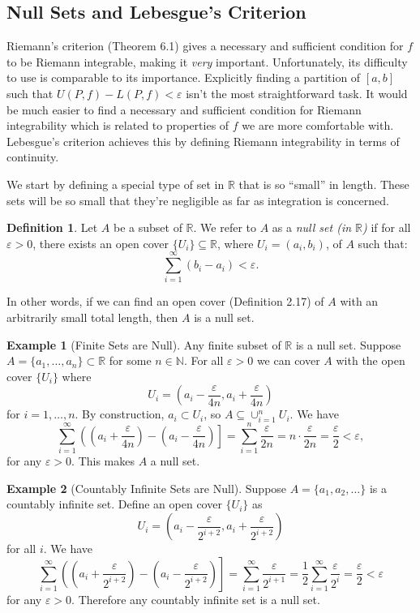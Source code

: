 \documentclass{article}
\newcommand{\N}{\mathbb{N}}
\newcommand{\R}{\mathbb{R}}
\theoremstyle{definition}
\newtheorem{definition}{Definition}[section]
\newtheorem{example}{Example}[section]
\begin{document}
	\subsection{Null Sets and Lebesgue's Criterion}
	Riemann's criterion (Theorem 6.1) gives a necessary and sufficient condition for $ f $ to be Riemann integrable, making it \textit{very} important. Unfortunately, its difficulty to use is comparable to its importance. Explicitly finding a partition of $ [a,b] $ such that $ U(P,f)-L(P,f)<\varepsilon $ isn't the most straightforward task. It would be much easier to find a necessary and sufficient condition for Riemann integrability which is related to properties of $ f $ we are more comfortable with. Lebesgue's criterion achieves this by defining Riemann integrability in terms of continuity. 
	
	We start by defining a special type of set in $ \R $ that is so ``small'' in length. These sets will be so small that they're negligible as far as integration is concerned. 
	\begin{definition}\label{def}
		Let $ A $ be a subset of $ \R $. We refer to $ A $ as a \textit{\color{red}null set (in $ \R $)} if for all $ \varepsilon > 0 $, there exists an open cover $ \{U_i\}\subseteq \R $, where $ U_i=(a_i,b_i) $, of $ A $ such that:
		$$\sum_{i=1}^\infty (b_i-a_i) < \varepsilon .$$
	\end{definition}
	In other words, if we can find an open cover (Definition 2.17) of $ A $ with an arbitrarily small total length, then $ A $ is a null set. 
	\begin{example}[Finite Sets are Null]
		Any finite subset of $ \R $ is a null set. Suppose $ A = \{a_1,\ldots,a_n\} \subset \R $ for some $ n\in \N $. For all $ \varepsilon>0 $ we can cover $ A $ with the open cover $ \{U_i\} $ where $$ U_i = \left(a_i-\frac{\varepsilon}{4n}, a_i+\frac{\varepsilon}{4n}\right) $$ for $ i=1,\ldots, n $. By construction, $ a_i \subset U_i $, so $ A \subseteq \cup_{i=1}^n U_i $. We have 
		$$\sum_{i=1}^{\infty} \left(\left(a_i+\frac{\varepsilon}{4n}\right) - \left(a_i-\frac{\varepsilon}{4n}\right)\right] = \sum_{i=1}^{n}\frac{\varepsilon}{2n}=n\cdot \frac{\varepsilon}{2n}=\frac{\varepsilon}{2}<\varepsilon,$$ for any $ \varepsilon > 0 $. This makes $ A $ a null set. 
	\end{example}
	\begin{example}[Countably Infinite Sets are Null]
		Suppose $ A=\{a_1,a_2,\ldots\} $ is a countably infinite set. Define an open cover $ \{U_i\} $ as $$ U_i = \left(a_i-\frac{\varepsilon}{2^{i+2}}, a_i+\frac{\varepsilon}{2^{i+2}}\right)$$ for all $ i $.  
		We have	$$\sum_{i=1}^{\infty} \left(\left(a_i+\frac{\varepsilon}{2^{i+2}}\right) - \left(a_i-\frac{\varepsilon}{2^{i+2}}\right)\right] = \sum_{i=1}^{\infty} \frac{\varepsilon}{2^{i+1}} = \frac{1}{2}\sum_{i=1}^{\infty} \frac{\varepsilon}{2^{i}}=\frac{\varepsilon}{2}< \varepsilon$$ for any $ \varepsilon >0 $. Therefore any countably infinite set is a null set.
	\end{example}
\end{document}
